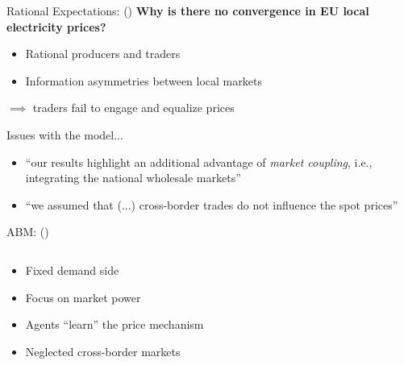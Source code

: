 \documentclass{beamer}
\begin{document}
\begin{frame}{Rational Expectations: \citeauthor{Gebhardt2013} (\citeyear{Gebhardt2013})}
    \textbf{Why is there no convergence in EU local electricity prices?}

    \begin{itemize} \setlength\itemsep{1.5em}
              \pause \item Rational producers and traders
              \pause \item Information asymmetries between local markets \pause
    \end{itemize}

    $\implies$ traders fail to engage and equalize prices

    Issues with the model...

    \begin{itemize} \setlength\itemsep{1.5em}
        \item ``our results highlight an additional advantage of \textit{market coupling}, i.e., integrating the national wholesale markets''
        \item ``we assumed that (...) cross-border trades do not influence the spot prices''
    \end{itemize}

\end{frame}

\begin{frame}{ABM: \citeauthor{Weidlich2008} (\citeyear{Weidlich2008})}

    \begin{columns}[T,onlytextwidth]

        \begin{column}{.4\textwidth}
            \begin{itemize} \setlength\itemsep{1.5em}
                \item Fixed demand side \pause
                \item Focus on market power \pause
                \item Agents ``learn'' the price mechanism \pause
                \item Neglected cross-border markets \pause
            \end{itemize}
        \end{column}

        \hfill

        \begin{column}{.6\textwidth}
            \centering
            \resizebox{0.7\textwidth}{!}{}
        \end{column}
    \end{columns}

\end{frame}
\end{document}
